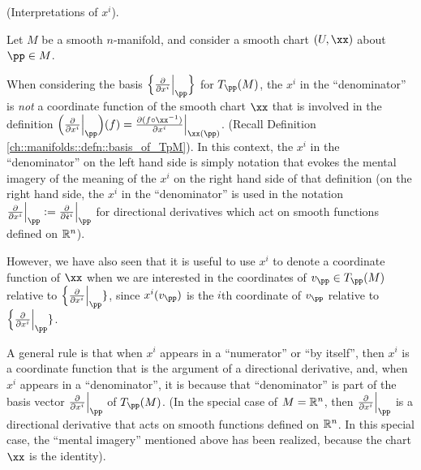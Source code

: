 \begin{remark}
    (Interpretations of $x^i$).
    
    Let $M$ be a smooth $n$-manifold, and consider a smooth chart $(U, \xx)$ about $\pp \in M$.
    
    When considering the basis $\Big\{ \frac{\pd}{\pd x^i}\Big|_\pp \Big\}$ for $T_\pp(M)$, the $x^i$ in the ``denominator'' is \textit{not} a coordinate function of the smooth chart $\xx$ that is involved in the definition $\Big(\frac{\pd}{\pd x^i}\Big|_\pp\Big)(f) = \frac{\pd (f \circ \xx^{-1})}{\pd x^i}\Big|_{\xx(\pp)}$. (Recall Definition \ref{ch::manifolds::defn::basis_of_TpM}). In this context, the $x^i$ in the ``denominator'' on the left hand side is simply notation that evokes the mental imagery of the meaning of the $x^i$ on the right hand side of that definition (on the right hand side, the $x^i$ in the ``denominator'' is used in the notation $\frac{\pd}{\pd x^i}\Big|_\pp := \frac{\pd}{\pd \see^i}\Big|_\pp$ for directional derivatives which act on smooth functions defined on $\mathbb{R}^n$).
    
    However, we have also seen that it is useful to use $x^i$ to denote a coordinate function of $\xx$ when we are interested in the coordinates of $v_\pp \in T_\pp(M)$ relative to $\Big\{ \frac{\pd}{\pd x^i}\Big|_\pp \}$, since $x^i(v_\pp)$ is the $i$th coordinate of $v_\pp$ relative to $\Big\{ \frac{\pd}{\pd x^i}\Big|_\pp \}$.
    
    A general rule is that when $x^i$ appears in a ``numerator'' or ``by itself'', then $x^i$ is a coordinate function that is the argument of a directional derivative, and, when $x^i$ appears in a ``denominator'', it is because that ``denominator'' is part of the basis vector $\frac{\pd}{\pd x^i}\Big|_\pp$ of $T_\pp(M)$. (In the special case of $M = \mathbb{R}^n$, then $\frac{\pd}{\pd x^i}\Big|_\pp$ is a directional derivative that acts on smooth functions defined on $\mathbb{R}^n$. In this special case, the ``mental imagery'' mentioned above has been realized, because the chart $\xx$ is the identity). 
\end{remark}

